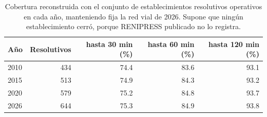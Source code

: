 \begin{table}[htbp]
\caption{Cobertura reconstruida con el conjunto de establecimientos resolutivos operativos en cada año, manteniendo fija la red vial de 2026. Supone que ningún establecimiento cerró, porque RENIPRESS publicado no lo registra.}
\label{tab:temporal}
\footnotesize
\begin{tabular}{lrrrr}
\toprule
Año & Resolutivos & hasta 30 min (\%) & hasta 60 min (\%) & hasta 120 min (\%) \\
\midrule
2010 & 434 & 74.4 & 83.6 & 93.1 \\
2015 & 513 & 74.9 & 84.3 & 93.2 \\
2020 & 579 & 75.2 & 84.8 & 93.7 \\
2026 & 644 & 75.3 & 84.9 & 93.8 \\
\bottomrule
\end{tabular}
\end{table}
